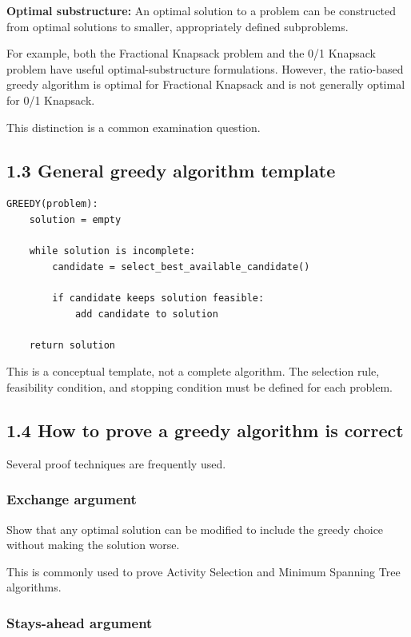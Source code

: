 \textbf{Optimal substructure:} An optimal solution to a problem can be constructed from optimal solutions to smaller, appropriately defined subproblems.

For example, both the Fractional Knapsack problem and the 0/1 Knapsack problem have useful optimal-substructure formulations. However, the ratio-based greedy algorithm is optimal for Fractional Knapsack and is not generally optimal for 0/1 Knapsack.

This distinction is a common examination question.

\subsection{1.3 General greedy algorithm template}

\begin{lstlisting}[style=pseudocode]
GREEDY(problem):
    solution = empty

    while solution is incomplete:
        candidate = select_best_available_candidate()

        if candidate keeps solution feasible:
            add candidate to solution

    return solution
\end{lstlisting}

This is a conceptual template, not a complete algorithm. The selection rule, feasibility condition, and stopping condition must be defined for each problem.

\subsection{1.4 How to prove a greedy algorithm is correct}

Several proof techniques are frequently used.

\subsubsection{Exchange argument}

Show that any optimal solution can be modified to include the greedy choice without making the solution worse.

This is commonly used to prove Activity Selection and Minimum Spanning Tree algorithms.

\subsubsection{Stays-ahead argument}


